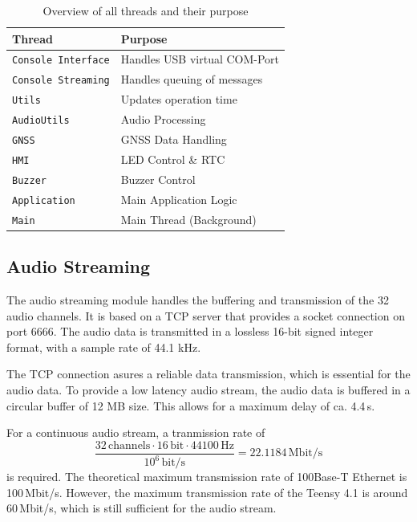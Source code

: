\begin{table}[h]
	\centering
	\begin{tabular}{|l|l|}
		\hline
		Thread                     & Purpose                      \\ \hline
		\texttt{Console Interface} & Handles USB virtual COM-Port \\ \hline
		\texttt{Console Streaming} & Handles queuing of messages  \\ \hline
		\texttt{Utils}             & Updates operation time       \\ \hline
		\texttt{AudioUtils}        & Audio Processing             \\ \hline
		\texttt{GNSS}              & GNSS Data Handling           \\ \hline
		\texttt{HMI}               & LED Control \& RTC           \\ \hline
		\texttt{Buzzer}            & Buzzer Control               \\ \hline
		\texttt{Application}       & Main Application Logic       \\ \hline
		\texttt{Main}              & Main Thread (Background)     \\ \hline
	\end{tabular}
	\caption{Overview of all threads and their purpose}
	\label{tab:threads}
\end{table}


\subsection{Audio Streaming}
The audio streaming module handles the buffering and transmission of the 32 audio channels.
It is based on a TCP server that provides a socket connection on port 6666.
The audio data is transmitted in a lossless 16-bit signed integer format, with a sample rate of 44.1 kHz.

The TCP connection asures a reliable data transmission, which is essential for the audio data.
To provide a low latency audio stream, the audio data is buffered in a circular buffer of 12 MB size.
This allows for a maximum delay of ca. 4.4\,s.

For a continuous audio stream, a tranmission rate of
\begin{equation}
	\frac{32\,\text{channels} \cdot 16\,\text{bit} \cdot 44100\,\text{Hz}}{10^6\,\text{bit/s}} = 22.1184\,\text{Mbit/s}
\end{equation}
is required.
The theoretical maximum transmission rate of 100Base-T Ethernet is 100\,Mbit/s.
However, the maximum transmission rate of the Teensy 4.1 is around 60\,Mbit/s, which is still sufficient for the audio stream.


